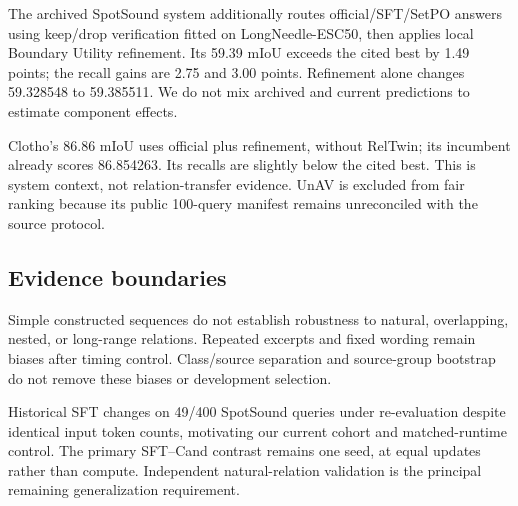 The archived SpotSound system additionally routes official/SFT/SetPO answers using keep/drop verification fitted on LongNeedle-ESC50, then applies local Boundary Utility refinement. Its 59.39 mIoU exceeds the cited best by 1.49 points; the recall gains are 2.75 and 3.00 points. Refinement alone changes 59.328548 to 59.385511. We do not mix archived and current predictions to estimate component effects.

Clotho's 86.86 mIoU uses official plus refinement, without RelTwin; its incumbent already scores 86.854263. Its recalls are slightly below the cited best. This is system context, not relation-transfer evidence. UnAV is excluded from fair ranking because its public 100-query manifest remains unreconciled with the source protocol.

\subsection{Evidence boundaries}
Simple constructed sequences do not establish robustness to natural, overlapping, nested, or long-range relations. Repeated excerpts and fixed wording remain biases after timing control. Class/source separation and source-group bootstrap do not remove these biases or development selection.

Historical SFT changes on 49/400 SpotSound queries under re-evaluation despite identical input token counts, motivating our current cohort and matched-runtime control. The primary SFT--Cand contrast remains one seed, at equal updates rather than compute. Independent natural-relation validation is the principal remaining generalization requirement.
